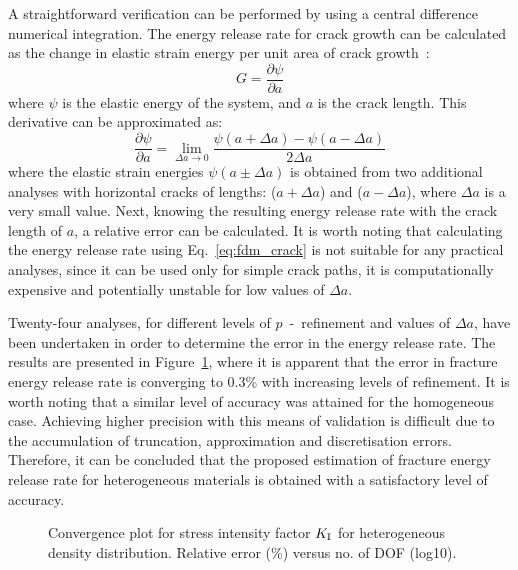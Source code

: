 \documentclass[onecolumn]{svjour3}
\begin{document}
A straightforward verification can be performed by using a central difference numerical integration. The energy release rate for crack growth can be calculated as the change in elastic strain energy per unit area of crack growth~\cite{Griffith163}:
\begin{equation}
G = \frac{\partial \psi}{\partial a}
\end{equation}
where $\psi$ is the elastic energy of the system, and $a$ is the crack length. This derivative can be approximated as:
\begin{equation}
 \frac{\partial \psi}{\partial a} = \lim_{\Delta a \to 0} \frac{\psi(a + \Delta a) - \psi(a -\Delta a)}{2\Delta a}
 \label{eq:fdm_crack}
\end{equation}
where the elastic strain energies $\psi(a \pm \Delta a)$ is obtained from two additional analyses with horizontal cracks of lengths: ($a + \Delta a$) and ($a - \Delta a$), where $\Delta a$ is a very small value. 
Next, knowing the resulting energy release rate with the crack length of $a$, a relative error can be calculated. It is worth noting that calculating the energy release rate using Eq.~\ref{eq:fdm_crack} is not suitable for any practical analyses, since it can be used only for simple crack paths, it is computationally expensive and potentially unstable for low values of $\Delta a$. 

Twenty-four analyses, for different levels of $p$~-~refinement and values of $\Delta a$, have been undertaken in order to determine the error in the energy release rate. 
The results are presented in Figure~\ref{fig:covergencefdm}, where it is apparent that the error in fracture energy release rate is converging to 0.3\% 
with increasing levels of refinement. It is worth noting that a similar level of accuracy was attained for the homogeneous case.  Achieving higher precision with this means of validation is difficult due to the accumulation of truncation, approximation and discretisation errors. Therefore, it can be concluded that the proposed estimation of fracture energy release rate for heterogeneous materials is obtained with a satisfactory level of accuracy.
\begin{figure}[h]
	\centering
	\caption{Convergence plot for stress intensity factor $K_{\rm I}$ for heterogeneous density distribution. Relative error (\%) versus no. of DOF (log10).}
	\label{fig:covergencefdm}
\end{figure}
\end{document}

